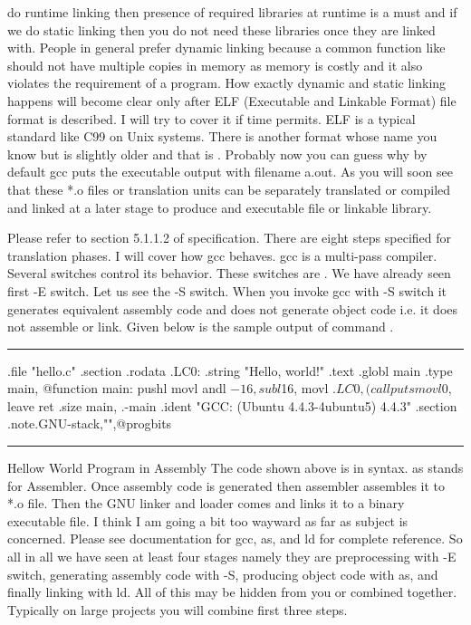 do runtime linking then presence of required libraries at runtime is a
must and if we do static linking then you do not need these libraries
once they are linked with. People in general prefer dynamic linking
because a common function like  should not have multiple
copies in memory as memory is costly and it also violates the
 requirement of a program. How exactly dynamic and
static linking happens will become clear only after ELF (Executable
and Linkable Format) file format is described. I will try to cover it
if time permits. ELF is a typical standard like C99 on Unix
systems. There is another format whose name you know but is slightly
older and that is . Probably now you can guess why by
default gcc puts the executable output with filename a.out. As you
will soon see that these *.o files or translation units can be
separately translated or compiled and linked at a later stage to
produce and executable file or linkable library.

Please refer to section 5.1.1.2 of specification. There are eight
steps specified for translation phases. I will cover how gcc
behaves. gcc is a multi-pass compiler. Several switches control its
behavior. These switches are . We have already seen
first -E switch. Let us see the -S switch. When you invoke gcc with -S
switch it generates equivalent assembly code and does not generate
object code i.e. it does not assemble or link. Given below is the
sample output of command .
\blank[force,1mm]\hrule\blank[force,1mm]
\startASM
	.file	"hello.c"
	.section	.rodata
.LC0:
	.string	"Hello, world!"
	.text
.globl main
	.type	main, @function
main:
	pushl	%
	movl	%
	andl	$-16, %
	subl	$16, %
	movl	$.LC0, (%
	call	puts
	movl	$0, %
	leave
	ret
	.size	main, .-main
	.ident	"GCC: (Ubuntu 4.4.3-4ubuntu5) 4.4.3"
	.section	.note.GNU-stack,"",@progbits
\stopASM
{}
\hrule
\blank[force,1mm]
\startalignment[middle]
Hellow World Program in Assembly
\stopalignment
The code shown above is in  syntax. as stands for
Assembler. Once assembly code is generated then assembler assembles it
to *.o file. Then  the GNU linker and loader comes and links
it to a binary executable file. I think I am going a bit too wayward
as far as subject is concerned. Please see documentation for gcc, as,
and ld for complete reference. So all in all we have seen at least
four stages namely they are preprocessing with -E switch, generating
assembly code with -S, producing object code with as, and finally
linking with ld. All of this may be hidden from you or combined
together. Typically on large projects you will combine first three
steps.

